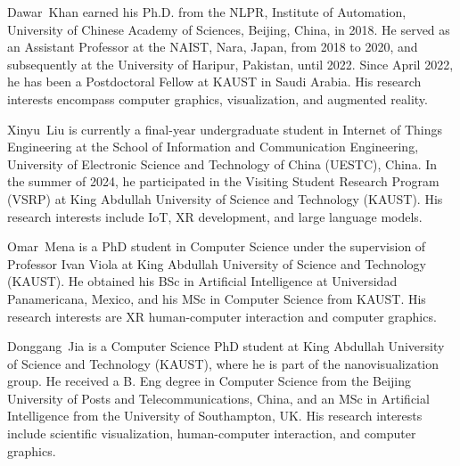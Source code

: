 
\begin{IEEEbiography}{Dawar~Khan} earned his Ph.D. from the NLPR,  Institute of Automation, University of Chinese Academy of Sciences, Beijing, China, in 2018. He served as an Assistant Professor at the NAIST, Nara, Japan, from 2018 to 2020, and subsequently at the University of Haripur, Pakistan, until 2022. Since April 2022, he has been a Postdoctoral Fellow at KAUST in Saudi Arabia. His research interests encompass computer graphics, visualization, and augmented reality.
\end{IEEEbiography} 
    \vskip -0.9996478cm 
\begin{IEEEbiography}{Xinyu~Liu}
is currently a final-year undergraduate student in Internet of Things Engineering at the School of Information and Communication Engineering, University of Electronic Science and Technology of China (UESTC), China. In the summer of 2024, he participated in the Visiting Student Research Program (VSRP) at King Abdullah University of Science and Technology (KAUST). His research interests include IoT, XR development, and large language models.
\end{IEEEbiography}
    \vskip -0.9996478cm 
\begin{IEEEbiography}{Omar~Mena}
 is a PhD student in Computer Science under the supervision of Professor Ivan Viola at  King Abdullah University of Science and Technology (KAUST). He obtained his BSc in Artificial Intelligence at Universidad Panamericana, Mexico, and his MSc in Computer Science from KAUST. His research interests are XR human-computer interaction and computer graphics.
\end{IEEEbiography}
    \vskip -0.9996478cm 
\begin{IEEEbiography}{Donggang~Jia}
 is a Computer Science PhD student at King Abdullah University of Science and Technology (KAUST), where he is part of the nanovisualization group. He received a B. Eng degree in Computer Science from the Beijing University of Posts and Telecommunications, China, and an MSc in Artificial Intelligence from the University of Southampton, UK. His research interests include scientific visualization, human-computer interaction, and computer graphics.
\end{IEEEbiography}
